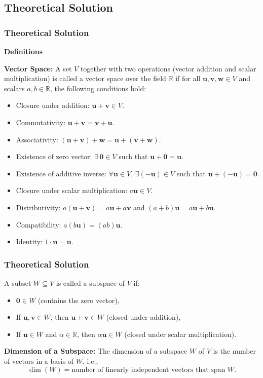 \documentclass{beamer}
\theoremstyle{remark}
\let\vec\mathbf
\numberwithin{equation}{section}
\begin{document}
\subsection{Theoretical Solution }
\begin{frame}
\frametitle{Theoretical Solution}
\textbf{Definitions}

\textbf{Vector Space:}  
A set $V$ together with two operations (vector addition and scalar multiplication) is called a vector space over the field $\mathbb{R}$ if for all $\vec{u},\vec{v},\vec{w} \in V$ and scalars $a,b \in \mathbb{R}$, the following conditions hold:
\begin{itemize}
    \item Closure under addition: $\vec{u}+\vec{v} \in V$.
    \item Commutativity: $\vec{u}+\vec{v} = \vec{v}+\vec{u}$.
    \item Associativity: $(\vec{u}+\vec{v})+\vec{w} = \vec{u}+(\vec{v}+\vec{w})$.
    \item Existence of zero vector: $\exists \, \vec{0} \in V$ such that $\vec{u}+\vec{0}=\vec{u}$.
    \item Existence of additive inverse: $\forall \vec{u}\in V, \, \exists (-\vec{u}) \in V$ such that $\vec{u}+(-\vec{u})=\vec{0}$.
    \item Closure under scalar multiplication: $a\vec{u} \in V$.
    \item Distributivity: $a(\vec{u}+\vec{v}) = a\vec{u}+a\vec{v}$ and $(a+b)\vec{u}=a\vec{u}+b\vec{u}$.
    \item Compatibility: $a(b\vec{u})=(ab)\vec{u}$.
    \item Identity: $1\cdot \vec{u}=\vec{u}$.
\end{itemize}


\end{frame}

\begin{frame}
\frametitle{Theoretical Solution}
A subset $W \subseteq V$ is called a subspace of $V$ if:
\begin{itemize}
    \item $\vec{0} \in W$ (contains the zero vector),
    \item If $\vec{u},\vec{v}\in W$, then $\vec{u}+\vec{v}\in W$ (closed under addition),
    \item If $\vec{u}\in W$ and $\alpha \in \mathbb{R}$, then $\alpha \vec{u} \in W$ (closed under scalar multiplication).
\end{itemize}

\textbf{Dimension of a Subspace:}  
The dimension of a subspace $W$ of $V$ is the number of vectors in a basis of $W$, i.e.,
\[
\dim(W) = \text{number of linearly independent vectors that span } W.
\]


\end{frame}
\end{document}
